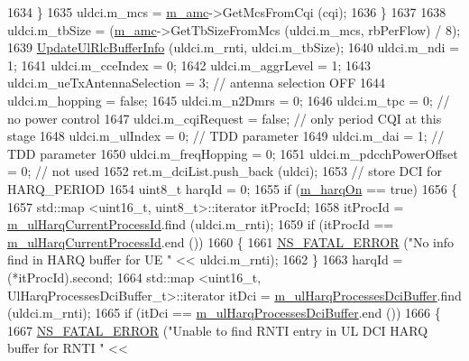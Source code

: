 \begin{DoxyCode}
1634             \}
1635           uldci.m\_mcs = \hyperlink{classns3_1_1TdBetFfMacScheduler_a3ba724ed3776a6cb493df6dd91b810d6}{m\_amc}->GetMcsFromCqi (cqi);
1636         \}
1637 
1638       uldci.m\_tbSize = (\hyperlink{classns3_1_1TdBetFfMacScheduler_a3ba724ed3776a6cb493df6dd91b810d6}{m\_amc}->GetTbSizeFromMcs (uldci.m\_mcs, rbPerFlow) / 8);
1639       \hyperlink{classns3_1_1TdBetFfMacScheduler_ac9a75f21284227100fa0c44091c01952}{UpdateUlRlcBufferInfo} (uldci.m\_rnti, uldci.m\_tbSize);
1640       uldci.m\_ndi = 1;
1641       uldci.m\_cceIndex = 0;
1642       uldci.m\_aggrLevel = 1;
1643       uldci.m\_ueTxAntennaSelection = 3; \textcolor{comment}{// antenna selection OFF}
1644       uldci.m\_hopping = \textcolor{keyword}{false};
1645       uldci.m\_n2Dmrs = 0;
1646       uldci.m\_tpc = 0; \textcolor{comment}{// no power control}
1647       uldci.m\_cqiRequest = \textcolor{keyword}{false}; \textcolor{comment}{// only period CQI at this stage}
1648       uldci.m\_ulIndex = 0; \textcolor{comment}{// TDD parameter}
1649       uldci.m\_dai = 1; \textcolor{comment}{// TDD parameter}
1650       uldci.m\_freqHopping = 0;
1651       uldci.m\_pdcchPowerOffset = 0; \textcolor{comment}{// not used}
1652       ret.m\_dciList.push\_back (uldci);
1653       \textcolor{comment}{// store DCI for HARQ\_PERIOD}
1654       uint8\_t harqId = 0;
1655       \textcolor{keywordflow}{if} (\hyperlink{classns3_1_1TdBetFfMacScheduler_a8de90c082c621bf8d664fff8cf370acb}{m\_harqOn} == \textcolor{keyword}{true})
1656         \{
1657           std::map <uint16\_t, uint8\_t>::iterator itProcId;
1658           itProcId = \hyperlink{classns3_1_1TdBetFfMacScheduler_a0776a2fc3f7186d7ec4491dc21706596}{m\_ulHarqCurrentProcessId}.find (uldci.m\_rnti);
1659           \textcolor{keywordflow}{if} (itProcId == \hyperlink{classns3_1_1TdBetFfMacScheduler_a0776a2fc3f7186d7ec4491dc21706596}{m\_ulHarqCurrentProcessId}.end ())
1660             \{
1661               \hyperlink{group__fatal_ga5131d5e3f75d7d4cbfd706ac456fdc85}{NS\_FATAL\_ERROR} (\textcolor{stringliteral}{"No info find in HARQ buffer for UE "} << uldci.m\_rnti);
1662             \}
1663           harqId = (*itProcId).second;
1664           std::map <uint16\_t, UlHarqProcessesDciBuffer\_t>::iterator itDci = 
      \hyperlink{classns3_1_1TdBetFfMacScheduler_a24641ddb697d45df50ee7bcaaacdb1e1}{m\_ulHarqProcessesDciBuffer}.find (uldci.m\_rnti);
1665           \textcolor{keywordflow}{if} (itDci == \hyperlink{classns3_1_1TdBetFfMacScheduler_a24641ddb697d45df50ee7bcaaacdb1e1}{m\_ulHarqProcessesDciBuffer}.end ())
1666             \{
1667               \hyperlink{group__fatal_ga5131d5e3f75d7d4cbfd706ac456fdc85}{NS\_FATAL\_ERROR} (\textcolor{stringliteral}{"Unable to find RNTI entry in UL DCI HARQ buffer for RNTI "} << 

\end{DoxyCode}
